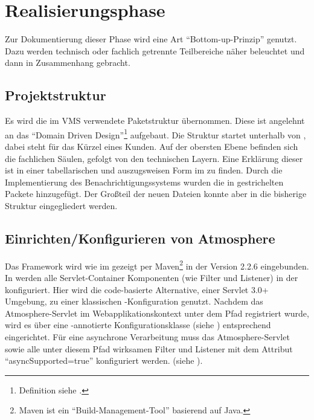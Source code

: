 \clearpage
\section{Realisierungsphase}
\label{sec:Realisierungsphase}
Zur Dokumentierung dieser Phase wird eine Art "`Bottom-up-Prinzip"' genutzt. Dazu werden technisch oder fachlich getrennte
Teilbereiche näher beleuchtet und dann in Zusammenhang gebracht.



\subsection{Projektstruktur}
\label{sub:Projektstruktur}

Es wird die im VMS verwendete Paketstruktur übernommen. Diese ist angelehnt an das "`Domain Driven
Design"'\footnote{Definition siehe \citep{DDD}.} aufgebaut. Die Struktur startet unterhalb von ,
dabei steht  für das Kürzel eines Kunden. Auf der obersten Ebene befinden sich die fachlichen Säulen, gefolgt von
den technischen Layern. Eine Erklärung dieser ist in einer tabellarischen und auszugsweisen Form im  zu
finden. Durch die Implementierung des Benachrichtigungssystems wurden die in  gestrichelten
Packete hinzugefügt. Der Großteil der neuen Dateien konnte aber in die bisherige Struktur eingegliedert werden.



\subsection{Einrichten/Konfigurieren von Atmosphere}
\label{sub:Einrichten/Konfigurieren von Atmosphere}
Das Framework wird wie im  gezeigt per Maven\footnote{Maven ist ein "`Build-Management-Tool"' basierend auf
Java.} in der Version 2.2.6 eingebunden. In  werden alle Servlet-Container Komponenten (wie Filter und Listener)
in der  konfiguriert. Hier wird die code-basierte Alternative, einer Servlet 3.0+ Umgebung, zu
einer klassischen -Konfiguration genutzt. Nachdem das Atmosphere-Servlet im Webapplikationskontext unter dem Pfad
 registriert wurde, wird es über eine -annotierte Konfigurationsklasse (siehe
) entsprechend eingerichtet. Für eine asynchrone Verarbeitung muss das Atmosphere-Servlet sowie alle
unter diesem Pfad wirksamen Filter und Listener mit dem Attribut "`asyncSupported=true"' konfiguriert werden. (siehe
).

